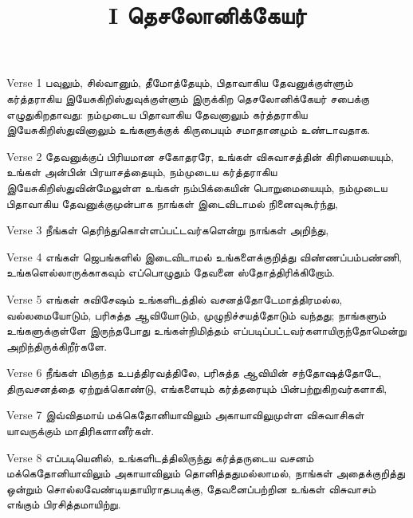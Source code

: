 \documentclass[
  ignorenonframetext,
]{beamer}
\title{I தெசலோனிக்கேயர்}
\author{}
\date{\vspace{-2.5em}}
\begin{document}
\frame{\titlepage}

\begin{frame}{Verse 1}
\protect\hypertarget{verse-1}{}
பவுலும், சில்வானும், தீமோத்தேயும், பிதாவாகிய தேவனுக்குள்ளும் கர்த்தராகிய
இயேசுகிறிஸ்துவுக்குள்ளும் இருக்கிற தெசலோனிக்கேயர் சபைக்கு எழுதுகிறதாவது:
நம்முடைய பிதாவாகிய தேவனாலும் கர்த்தராகிய இயேசுகிறிஸ்துவினாலும்
உங்களுக்குக் கிருபையும் சமாதானமும் உண்டாவதாக.
\end{frame}

\begin{frame}{Verse 2}
\protect\hypertarget{verse-2}{}
தேவனுக்குப் பிரியமான சகோதரரே, உங்கள் விசுவாசத்தின் கிரியையையும், உங்கள்
அன்பின் பிரயாசத்தையும், நம்முடைய கர்த்தராகிய இயேசுகிறிஸ்துவின்மேலுள்ள
உங்கள் நம்பிக்கையின் பொறுமையையும், நம்முடைய பிதாவாகிய தேவனுக்குமுன்பாக
நாங்கள் இடைவிடாமல் நினைவுகூர்ந்து,
\end{frame}

\begin{frame}{Verse 3}
\protect\hypertarget{verse-3}{}
நீங்கள் தெரிந்துகொள்ளப்பட்டவர்களென்று நாங்கள் அறிந்து,
\end{frame}

\begin{frame}{Verse 4}
\protect\hypertarget{verse-4}{}
எங்கள் ஜெபங்களில் இடைவிடாமல் உங்களைக்குறித்து விண்ணப்பம்பண்ணி,
உங்களெல்லாருக்காகவும் எப்பொழுதும் தேவனை ஸ்தோத்திரிக்கிறோம்.
\end{frame}

\begin{frame}{Verse 5}
\protect\hypertarget{verse-5}{}
எங்கள் சுவிசேஷம் உங்களிடத்தில் வசனத்தோடேமாத்திரமல்ல, வல்லமையோடும்,
பரிசுத்த ஆவியோடும், முழுநிச்சயத்தோடும் வந்தது; நாங்களும் உங்களுக்குள்ளே
இருந்தபோது உங்கள்நிமித்தம் எப்படிப்பட்டவர்களாயிருந்தோமென்று
அறிந்திருக்கிறீர்களே.
\end{frame}

\begin{frame}{Verse 6}
\protect\hypertarget{verse-6}{}
நீங்கள் மிகுந்த உபத்திரவத்திலே, பரிசுத்த ஆவியின் சந்தோஷத்தோடே,
திருவசனத்தை ஏற்றுக்கொண்டு, எங்களையும் கர்த்தரையும் பின்பற்றுகிறவர்களாகி,
\end{frame}

\begin{frame}{Verse 7}
\protect\hypertarget{verse-7}{}
இவ்விதமாய் மக்கெதோனியாவிலும் அகாயாவிலுமுள்ள விசுவாசிகள் யாவருக்கும்
மாதிரிகளானீர்கள்.
\end{frame}

\begin{frame}{Verse 8}
\protect\hypertarget{verse-8}{}
எப்படியெனில், உங்களிடத்திலிருந்து கர்த்தருடைய வசனம் மக்கெதோனியாவிலும்
அகாயாவிலும் தொனித்ததுமல்லாமல், நாங்கள் அதைக்குறித்து ஒன்றும்
சொல்லவேண்டியதாயிராதபடிக்கு, தேவனைப்பற்றின உங்கள் விசுவாசம் எங்கும்
பிரசித்தமாயிற்று.
\end{frame}
\end{document}
